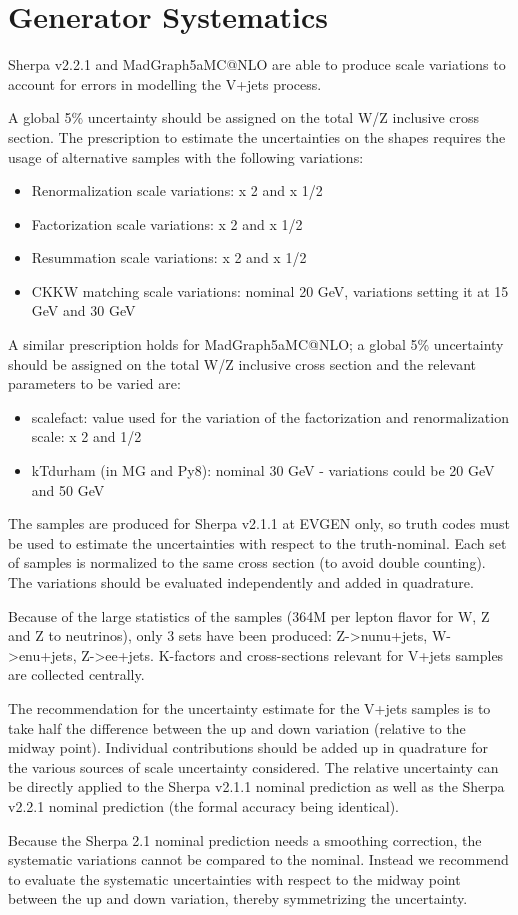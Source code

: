 \section{Generator Systematics}
\label{sec:systematics}

Sherpa v2.2.1 and MadGraph5\textunderscore aMC@NLO are able to produce scale variations to account for errors in modelling the V+jets process. 

A global 5\% uncertainty should be assigned on the total W/Z inclusive cross section. The prescription to estimate the uncertainties on the shapes requires the usage of alternative samples with the following variations:

\begin{itemize}
\item Renormalization scale variations: x 2 and x 1/2
\item Factorization scale variations: x 2 and x 1/2
\item Resummation scale variations: x 2 and x 1/2
\item CKKW matching scale variations: nominal 20 GeV, variations setting it at 15 GeV and 30 GeV 

\end{itemize}

A similar prescription holds for MadGraph5\textunderscore aMC@NLO; a global 5\% uncertainty should be assigned on the total W/Z inclusive cross section and the relevant parameters to be varied are:
\begin{itemize}
\item scalefact: value used for the variation of the factorization and renormalization scale: x 2 and 1/2
\item kTdurham (in MG and Py8): nominal 30 GeV - variations could be 20 GeV and 50 GeV 
\end{itemize}

The samples are produced for Sherpa v2.1.1 at EVGEN only, so truth codes must be used to estimate the uncertainties with respect to the truth-nominal. Each set of samples is normalized to the same cross section (to avoid double counting). The variations should be evaluated independently and added in quadrature.

Because of the large statistics of the samples (364M per lepton flavor for W, Z and Z to neutrinos), only 3 sets have been produced: Z->nunu+jets, W->enu+jets, Z->ee+jets. K-factors and cross-sections relevant for V+jets samples are collected centrally.

The recommendation for the uncertainty estimate for the V+jets samples is to take half the difference between the up and down variation (relative to the midway point). Individual contributions should be added up in quadrature for the various sources of scale uncertainty considered. The relative uncertainty can be directly applied to the Sherpa v2.1.1 nominal prediction as well as the Sherpa v2.2.1 nominal prediction (the formal accuracy being identical). 

Because the Sherpa 2.1 nominal prediction needs a smoothing correction, the systematic variations cannot be compared to the nominal. Instead we recommend to evaluate the systematic uncertainties with respect to the midway point between the up and down variation, thereby symmetrizing the uncertainty. 